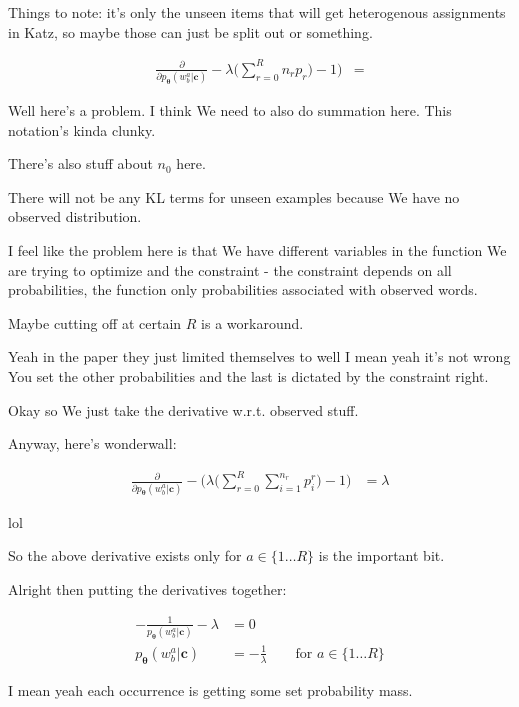\documentclass{article}
\newcommand{\vtheta}{\boldsymbol{\theta}}
\newcommand{\model}{p_{\vtheta}}
\newcommand{\context}{\boldsymbol{c}}
\begin{document}
			Things to note: it's only the unseen items that will get heterogenous assignments in Katz, so maybe those can just be split out or something.
			
			\begin{align}
				\frac{\partial }{\partial \model(w^a_b|\context)} - \lambda\bigg(\sum^R_{r=0}n_r p_r\bigg) -1\bigg) &= 
			\end{align}
			
			Well here's a problem. I think We need to also do summation here. This notation's kinda clunky.
			
			There's also stuff about $n_0$ here. 
			
			There will not be any KL terms for unseen examples because We have no observed distribution. 
			
			I feel like the problem here is that We have different variables in the function We are trying to optimize and the constraint - the constraint depends on all probabilities, the function only probabilities associated with observed words.
			
			Maybe cutting off at certain $R$ is a workaround.
			
			Yeah in the paper they just limited themselves to well I mean yeah it's not wrong You set the other probabilities and the last is dictated by the constraint right.
			
			Okay so We just take the derivative w.r.t. observed stuff.
			
			Anyway, here's wonderwall:
			
			\begin{align}
				\frac{\partial }{\partial \model(w^a_b|\context)} -\bigg(\lambda  \bigg( \sum^R_{r=0} \sum^{n_r}_{i=1} p^r_i \bigg)-1\bigg) &= \lambda
			\end{align}
			
			lol
			
			So the above derivative exists only for $a\in\{1\ldots R\}$ is the important bit.
			
			Alright then putting the derivatives together:
			
			\begin{align}
				-\frac{1}{\model(w^a_b|\context)} - \lambda &= 0\\
				\model(w^a_b|\context)  &= -\frac{1}{\lambda}\qquad\text{for }a\in\{1\ldots R\}
			\end{align}
			
			I mean yeah each occurrence is getting some set probability mass.
			
\end{document}
